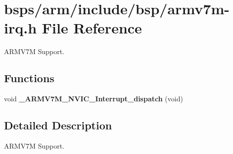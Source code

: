 \hypertarget{armv7m-irq_8h}{}\section{bsps/arm/include/bsp/armv7m-\/irq.h File Reference}
\label{armv7m-irq_8h}


A\+R\+M\+V7M Support.  


\subsection*{Functions}
\begin{DoxyCompactItemize}
\item 
\mbox{\label{armv7m-irq_8h_a097adb2fe786e0c0c209b56109fda42a}} 
void {\bfseries \+\_\+\+A\+R\+M\+V7\+M\+\_\+\+N\+V\+I\+C\+\_\+\+Interrupt\+\_\+dispatch} (void)
\end{DoxyCompactItemize}


\subsection{Detailed Description}
A\+R\+M\+V7M Support. 

